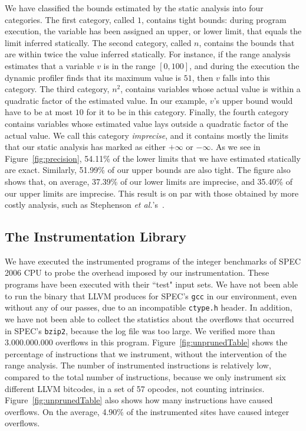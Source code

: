 \documentclass{sigplanconf}[10pt]
\begin{document}
We have classified the bounds estimated by the static analysis into four
categories.
The first category, called $1$, contains tight bounds:
during program execution, the variable has been assigned an upper,
or lower limit, that equals the limit inferred statically.
The second category, called $n$, contains the bounds that are
within twice the value inferred statically.
For instance, if the range analysis estimates that a variable $v$ is in the
range $[0, 100]$, and during the execution the dynamic profiler finds that
its maximum value is $51$, then $v$ falls into this category.
The third category, $n^2$, contains variables whose actual value is within
a quadratic factor of the estimated value.
In our example, $v$'s upper bound would have to be at most $10$ for it to
be in this category.
Finally, the fourth category contains variables whose estimated value lays
outside a quadratic factor of the actual value.
We call this category {\em imprecise}, and it contains mostly the limits that
our static analysis has marked as either $+\infty$ or $-\infty$.
As we see in Figure~\ref{fig:precision}, 54.11\% of the lower limits that
we have estimated statically are exact.
Similarly, 51.99\% of our upper bounds are also tight.
The figure also shows that, on average, 37.39\% of our lower limits are
imprecise, and 35.40\% of our upper limits are imprecise.
This result is on par with those obtained by more costly analysis, such as
Stephenson {\em et al.}'s~\cite{Stephenson00}.




\subsection{The Instrumentation Library}
\label{sub:inst}

We have executed the instrumented programs of the integer benchmarks of SPEC
2006 CPU to probe the overhead imposed by our instrumentation.
These programs have been executed with their ``test" input sets.
We have not been able to run the binary that LLVM produces for SPEC's
\texttt{gcc} in our environment, even without any of our passes, due to an
incompatible \texttt{ctype.h} header.
In addition, we have not been able to collect the statistics about
the overflows that occurred in SPEC's \texttt{bzip2}, because the log file
was too large.
We verified more than 3.000.000.000  overflows in this program.
Figure~\ref{fig:unprunedTable} shows the percentage of instructions that
we instrument, without the intervention of the range analysis.
The number of instrumented instructions is relatively low, compared to the
total number of instructions, because we only instrument six different
LLVM bitcodes, in a set of 57 opcodes, not counting intrinsics.
Figure~\ref{fig:unprunedTable} also shows how many instructions have caused
overflows.
On the average, 4.90\% of the instrumented sites have caused integer overflows.
\end{document}
